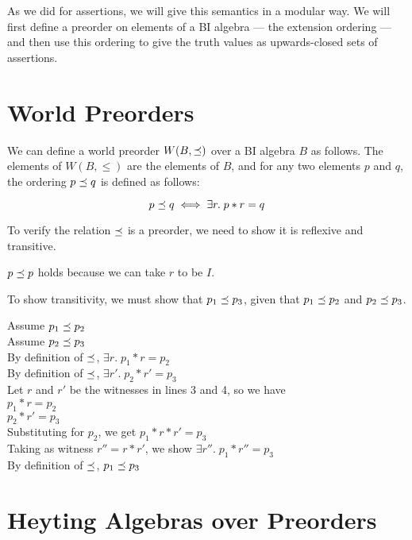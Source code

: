 As we did for assertions, we will give this semantics in a modular
way. We will first define a preorder on elements of a BI algebra --- the
extension ordering --- and then use this ordering to give the truth
values as upwards-closed sets of assertions.

\section{World Preorders}

We can define a world preorder $W(B, \preceq)$ over a BI algebra $B$ as
follows.  The elements of $W(B, \leq)$ are the elements of $B$, and for any
two elements $p$ and $q$, the ordering $p \preceq q$ is defined as
follows:

\begin{displaymath}
p \preceq q \iff \exists r.\; p * r = q
\end{displaymath}

To verify the relation $\preceq$ is a preorder, we need to 
show it is reflexive and transitive. 

$p \preceq p$ holds because we can take $r$ to be $I$. 


To show transitivity, we must show that $p_1 \preceq p_3$, given
that $p_1 \preceq p_2$ and $p_2 \preceq p_3$.

\begin{tabbedproof}
\oo Assume $p_1 \preceq p_2$  \\
\oo Assume $p_2 \preceq p_3$  \\
\ooo By definition of $\preceq$, $\exists r.\; p_1 * r = p_2$ \\
\ooo By definition of $\preceq$, $\exists r'.\; p_2 * r' = p_3$ \\
\ooo Let $r$ and $r'$ be the witnesses in lines 3 and 4, so we have \\
\oooo $p_1 * r = p_2$ \\
\oooo $p_2 * r' = p_3$ \\
\oooo Substituting for $p_2$, we get $p_1 * r * r' = p_3$ \\
\oooo Taking as witness $r'' = r * r'$, we show $\exists r''.\; p_1 * r'' = p_3$ \\
\ooo By definition of $\preceq$, $p_1 \preceq p_3$ \\
\end{tabbedproof}

\section{Heyting Algebras over Preorders}

